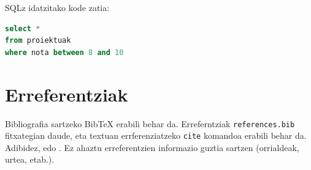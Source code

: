 SQLz idatzitako kode zatia:
\begin{lstlisting}[language=SQL,numbers=none]
select *
from proiektuak
where nota between 8 and 10
\end{lstlisting}


\section{Erreferentziak}

Bibliografia sartzeko BibTeX erabili behar da. Erreferntziak \texttt{references.bib} fitxategian daude, eta textuan errferenziatzeko \texttt{cite} komandoa erabili behar da. Adibidez, \cite{Shahbaba2011} edo \cite{Efron1994, Rmanual, Subramanian2005gene}. Ez ahaztu erreferentzien informazio guztia sartzen (orrialdeak, urtea, etab.).

